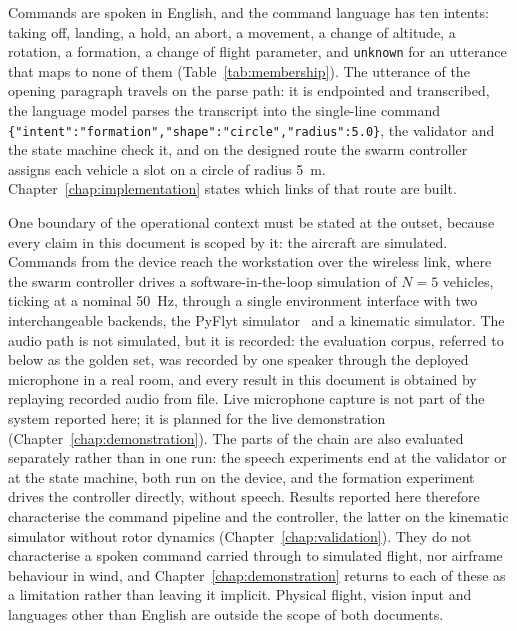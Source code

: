 Commands are spoken in English, and the command language has ten intents: taking off, landing, a
hold, an abort, a movement, a change of altitude, a rotation, a formation, a change of flight
parameter, and \texttt{unknown} for an utterance that maps to none of them
(Table~\ref{tab:membership}). The utterance of the opening paragraph travels on the parse
path: it is endpointed and transcribed, the language model parses the transcript into the single-line
command \texttt{\{"intent":"formation","shape":"circle","radius":5.0\}}, the validator and the state
machine check it, and on the designed route the swarm controller assigns each vehicle a slot on a
circle of radius 5~m. Chapter~\ref{chap:implementation} states which links of that route are built.

One boundary of the operational context must be stated at the outset, because every claim in this
document is scoped by it: the aircraft are simulated. Commands from the device reach the
workstation over the wireless link, where the swarm controller drives a software-in-the-loop
simulation of $N = 5$ vehicles, ticking at a nominal 50~Hz, through a single environment interface
with two interchangeable backends, the PyFlyt simulator~\cite{pyflyt} and a kinematic simulator. The audio
path is not simulated, but it is recorded: the evaluation corpus, referred to below as the golden
set, was recorded by one speaker through the deployed microphone in a real room, and every result
in this document is obtained by replaying recorded audio from file. Live microphone capture is not
part of the system reported here; it is planned for the live demonstration
(Chapter~\ref{chap:demonstration}). The parts of the chain are also evaluated separately rather than
in one run: the speech experiments end at the validator or at the state machine, both run on the
device, and the formation experiment drives the controller directly, without speech. Results
reported here therefore characterise the command pipeline and the controller, the latter on the
kinematic simulator without rotor dynamics (Chapter~\ref{chap:validation}). They do not
characterise a spoken command carried through to simulated flight, nor airframe behaviour in wind,
and Chapter~\ref{chap:demonstration} returns to each of these as a limitation rather than leaving
it implicit. Physical flight, vision input and languages other than English are outside the scope
of both documents.

